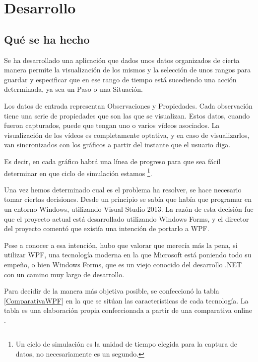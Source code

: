 \chapter{Desarrollo}

\section{Qu\'{e} se ha hecho}
Se ha desarrollado una aplicaci\'{o}n que dados unos datos organizados
de cierta manera permite la visualizaci\'{o}n de los mismos y
la selecci\'{o}n de unos rangos para guardar y especificar que en ese rango de tiempo
est\'{a} sucediendo una acci\'{o}n determinada, ya sea un Paso o una Situaci\'on.

Los datos de entrada representan Observaciones y Propiedades. Cada observaci\'{o}n tiene una serie
de propiedades que son las que se visualizan. Estos datos, cuando fueron capturados, puede
que tengan uno o varios v\'{i}deos asociados. La visualizaci\'{o}n de los v\'{i}deos es completamente
optativa, y en caso de visualizarlos, van sincronizados con los gr\'{a}ficos a partir del instante que el 
usuario diga.

Es decir, en cada gr\'{a}fico habr\'{a} una l\'{i}nea de progreso para que sea f\'{a}cil determinar en que ciclo
de simulaci\'{o}n estamos \footnote{Un ciclo de simulaci\'{o}n es la unidad de tiempo elegida para la captura de datos, no
    necesariamente es un segundo.}.

Una vez hemos determinado cual es el problema ha resolver, se hace necesario tomar ciertas decisiones.
Desde un principio se sab\'ia que hab\'ia que programar en un entorno Windows, utilizando Visual Studio 2013.
La raz\'on de esta decisi\'on fue que el proyecto actual est\'a desarrollado utilizando Windows Forms, y el 
director del proyecto coment\'o que exist\'ia una intenci\'on de portarlo a WPF.

Pese a conocer a esa intenci\'on, hubo que valorar que merec\'ia m\'as la pena, si utilizar WPF, una tecnolog\'ia moderna
en la que Microsoft est\'a poniendo todo su empe\~no, o bien Windows Forms, que es un viejo conocido del desarrollo
.NET con un camino muy largo de desarrollo.

Para decidir de la manera m\'as objetiva posible, se confeccion\'o la tabla \ref{ComparativaWPF} en la que se sit\'uan 
las caracter\'isticas de cada tecnolog\'ia. La tabla es una elaboraci\'on propia confeccionada a partir de una comparativa
online \cite{WPFvsWinForms:Comparative}.

